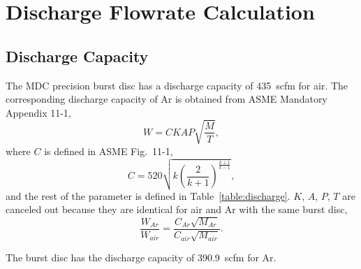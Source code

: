 \section{Discharge Flowrate Calculation}
\label{app:discharge}

\subsection{Discharge Capacity}
\label{app:discharge_capacity}

The MDC precision burst disc has a discharge capacity of 435~scfm for air.
The corresponding discharge capacity of Ar is obtained from ASME Mandatory Appendix 11-1,
\begin{equation}
    \label{eq:discharge}
    W = CKAP\sqrt{\frac{M}{T}},
\end{equation}
where $C$ is defined in ASME Fig.~11-1,
\begin{equation}
    \label{eq:constant_k}
    C = 520\sqrt{k\left(\frac{2}{k+1}\right)^{\frac{k+1}{k-1}}},
\end{equation}
and the rest of the parameter is defined in Table~\ref{table:discharge}.
$K$, $A$, $P$, $T$ are canceled out because they are identical for air and Ar
with the same burst disc,
\begin{equation}
    \frac{W_{Ar}}{W_{air}} = \frac{C_{Ar}\sqrt{M_{Ar}}}{C_{air}\sqrt{M_{air}}}.
\end{equation}



The burst disc has the discharge capacity of 390.9~scfm for Ar.


